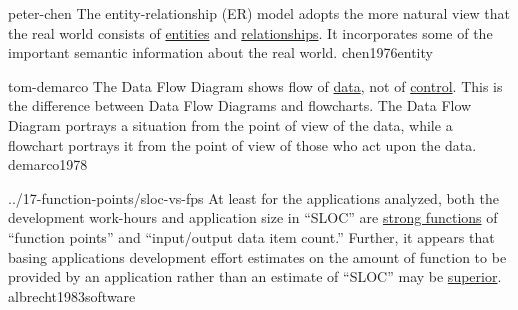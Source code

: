 \documentclass{article}
\begin{document}

\qte
  {peter-chen}
  {The entity-relationship (ER) model adopts the more natural view that the real world consists of \ul{entities} and \ul{relationships}. It incorporates some of the important semantic information about the real world.}
  {chen1976entity}


\qte
  {tom-demarco}
  {The Data Flow Diagram shows flow of \ul{data}, not of \ul{control}. This is the difference between Data Flow Diagrams and flowcharts. The Data Flow Diagram portrays a situation from the point of view of the data, while a flowchart portrays it from the point of view of those who act upon the data.}
  {demarco1978}


\qte
  {../17-function-points/sloc-vs-fps}
  {At least for the applications analyzed, both the development work-hours and application size in ``SLOC'' are \ul{strong functions} of ``function points'' and ``input/output data item count.'' Further, it appears that basing applications development effort estimates on the amount of function to be provided by an application rather than an estimate of ``SLOC'' may be \ul{superior}.}
  {albrecht1983software}
\end{document}
